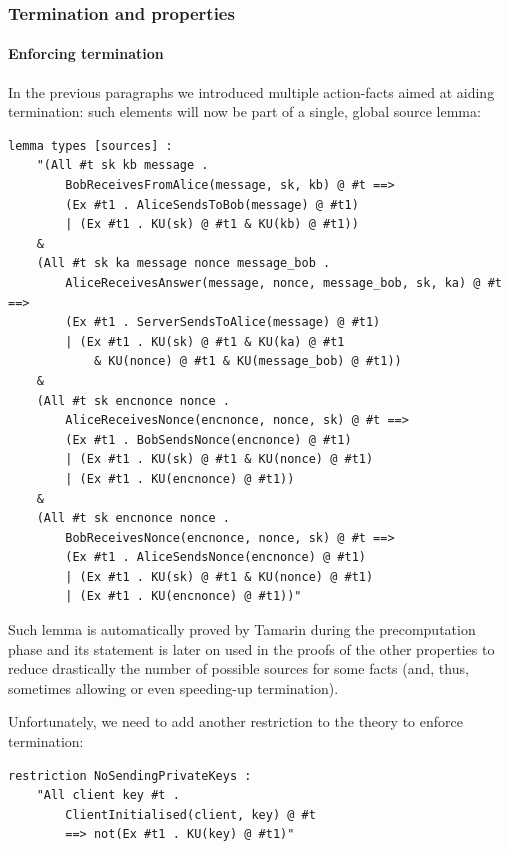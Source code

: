 \documentclass[fleqn,10pt]{SelfArx} %
\begin{document}
\subsubsection{Termination and properties}\label{subsec:termination}

\paragraph{Enforcing termination}

In the previous paragraphs we introduced multiple action-facts aimed at aiding termination: such elements will now be part of a single, global source lemma:

\begin{lstlisting}[language=Tamarin]
lemma types [sources] :
    "(All #t sk kb message .
        BobReceivesFromAlice(message, sk, kb) @ #t ==>
        (Ex #t1 . AliceSendsToBob(message) @ #t1)
        | (Ex #t1 . KU(sk) @ #t1 & KU(kb) @ #t1))
    &
    (All #t sk ka message nonce message_bob . 
        AliceReceivesAnswer(message, nonce, message_bob, sk, ka) @ #t ==>
        (Ex #t1 . ServerSendsToAlice(message) @ #t1)
        | (Ex #t1 . KU(sk) @ #t1 & KU(ka) @ #t1
            & KU(nonce) @ #t1 & KU(message_bob) @ #t1))
    &
    (All #t sk encnonce nonce .
        AliceReceivesNonce(encnonce, nonce, sk) @ #t ==>
        (Ex #t1 . BobSendsNonce(encnonce) @ #t1)
        | (Ex #t1 . KU(sk) @ #t1 & KU(nonce) @ #t1)
        | (Ex #t1 . KU(encnonce) @ #t1))
    &
    (All #t sk encnonce nonce .
        BobReceivesNonce(encnonce, nonce, sk) @ #t ==>
        (Ex #t1 . AliceSendsNonce(encnonce) @ #t1)
        | (Ex #t1 . KU(sk) @ #t1 & KU(nonce) @ #t1)
        | (Ex #t1 . KU(encnonce) @ #t1))"
\end{lstlisting}

Such lemma is automatically proved by Tamarin during the precomputation phase and its statement is later on used in the proofs of the other properties to reduce drastically the number of possible sources for some facts (and, thus, sometimes allowing or even speeding-up termination).

Unfortunately, we need to add another restriction to the theory to enforce termination:

\begin{lstlisting}[language=Tamarin]
restriction NoSendingPrivateKeys :
    "All client key #t .
        ClientInitialised(client, key) @ #t
        ==> not(Ex #t1 . KU(key) @ #t1)"
\end{lstlisting}
\end{document}
